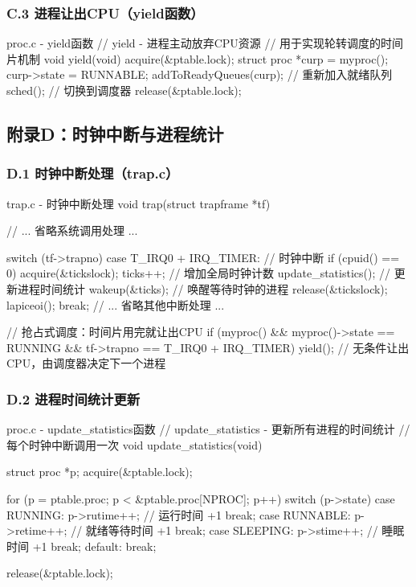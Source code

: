 \documentclass[a4paper, 12pt]{article}
\begin{document}
    \subsubsection{C.3 进程让出CPU（yield函数）}
    
    \begin{codeblock}{proc.c - yield函数}
// yield - 进程主动放弃CPU资源
// 用于实现轮转调度的时间片机制
void yield(void) {
    acquire(&ptable.lock);
    struct proc *curp = myproc();
    curp->state = RUNNABLE;
    addToReadyQueues(curp);  // 重新加入就绪队列
    sched();                  // 切换到调度器
    release(&ptable.lock);
}
    \end{codeblock}
    
    \subsection{附录D：时钟中断与进程统计}
    
    \subsubsection{D.1 时钟中断处理（trap.c）}
    
    \begin{codeblock}{trap.c - 时钟中断处理}
void trap(struct trapframe *tf) {
    // ... 省略系统调用处理 ...
    
    switch (tf->trapno) {
    case T_IRQ0 + IRQ_TIMER:  // 时钟中断
        if (cpuid() == 0) {
            acquire(&tickslock);
            ticks++;                  // 增加全局时钟计数
            update_statistics();      // 更新进程时间统计
            wakeup(&ticks);           // 唤醒等待时钟的进程
            release(&tickslock);
        }
        lapiceoi();
        break;
    // ... 省略其他中断处理 ...
    }
    
    // 抢占式调度：时间片用完就让出CPU
    if (myproc() && myproc()->state == RUNNING &&
        tf->trapno == T_IRQ0 + IRQ_TIMER) {
        yield();  // 无条件让出CPU，由调度器决定下一个进程
    }
}
    \end{codeblock}
    
    \subsubsection{D.2 进程时间统计更新}
    
    \begin{codeblock}{proc.c - update\_statistics函数}
// update_statistics - 更新所有进程的时间统计
// 每个时钟中断调用一次
void update_statistics(void) {
    struct proc *p;
    acquire(&ptable.lock);
    
    for (p = ptable.proc; p < &ptable.proc[NPROC]; p++) {
        switch (p->state) {
        case RUNNING:
            p->rutime++;   // 运行时间 +1
            break;
        case RUNNABLE:
            p->retime++;   // 就绪等待时间 +1
            break;
        case SLEEPING:
            p->stime++;    // 睡眠时间 +1
            break;
        default:
            break;
        }
    }
    
    release(&ptable.lock);
}
    \end{codeblock}
    
\end{document}
